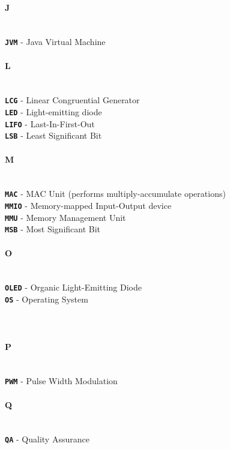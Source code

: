 \documentclass[english, ing, kiv, he, iso690numb, pdf]{fasthesis}
\begin{document}
	\paragraph{J}
	\\
	\noindent
	\textbf{\texttt{JVM}} - Java Virtual Machine \\
	\paragraph{L}
	\\
	\noindent
	\textbf{\texttt{LCG}} - Linear Congruential Generator \\
	\textbf{\texttt{LED}} - Light-emitting diode \\
	\textbf{\texttt{LIFO}} - Last-In-First-Out \\
	\textbf{\texttt{LSB}} - Least Significant Bit \\
	\paragraph{M}
	\\
	\noindent
	\textbf{\texttt{MAC}} - MAC Unit (performs multiply-accumulate operations) \\
	\textbf{\texttt{MMIO}} - Memory-mapped Input-Output device \\
	\textbf{\texttt{MMU}} - Memory Management Unit \\
	\textbf{\texttt{MSB}} - Most Significant Bit \\
	\paragraph{O}
	\\
	\noindent
	\textbf{\texttt{OLED}} - Organic Light-Emitting Diode \\
	\textbf{\texttt{OS}} - Operating System \\
	\\
	\\
	\paragraph{P}
	\\
	\noindent
	\textbf{\texttt{PWM}} - Pulse Width Modulation \\
	\paragraph{Q}
	\\
	\noindent
	\textbf{\texttt{QA}} - Quality Assurance \\
\end{document}

